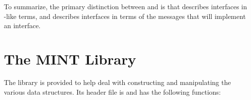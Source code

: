 To summarize, the primary distinction between \AOI{} and \MINT{} is that \AOI{}
describes interfaces in \IDL{}-like terms, and \MINT{} describes interfaces in
terms of the messages that will implement an interface.



\section{The MINT Library}
\label{sec:MINT:The MINT Library}

The  library is provided to help deal with constructing and
manipulating the various \MINT{} data structures.  Its header file is
 and has the following functions:

